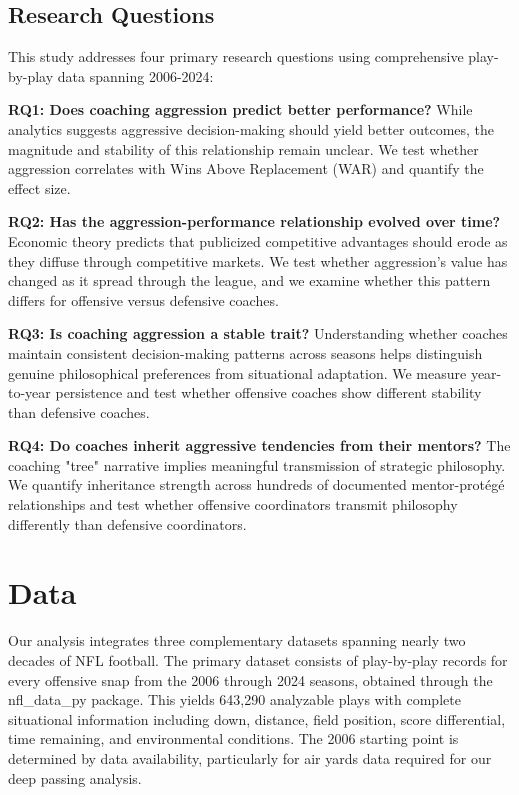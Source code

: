 \documentclass[11pt,twocolumn]{article}
\begin{document}
\subsection{Research Questions}

This study addresses four primary research questions using comprehensive play-by-play data spanning 2006-2024:

\textbf{RQ1: Does coaching aggression predict better performance?} While analytics suggests aggressive decision-making should yield better outcomes, the magnitude and stability of this relationship remain unclear. We test whether aggression correlates with Wins Above Replacement (WAR) and quantify the effect size.

\textbf{RQ2: Has the aggression-performance relationship evolved over time?} Economic theory predicts that publicized competitive advantages should erode as they diffuse through competitive markets. We test whether aggression's value has changed as it spread through the league, and we examine whether this pattern differs for offensive versus defensive coaches.

\textbf{RQ3: Is coaching aggression a stable trait?} Understanding whether coaches maintain consistent decision-making patterns across seasons helps distinguish genuine philosophical preferences from situational adaptation. We measure year-to-year persistence and test whether offensive coaches show different stability than defensive coaches.

\textbf{RQ4: Do coaches inherit aggressive tendencies from their mentors?} The coaching "tree" narrative implies meaningful transmission of strategic philosophy. We quantify inheritance strength across hundreds of documented mentor-protégé relationships and test whether offensive coordinators transmit philosophy differently than defensive coordinators.

\section{Data}

Our analysis integrates three complementary datasets spanning nearly two decades of NFL football. The primary dataset consists of play-by-play records for every offensive snap from the 2006 through 2024 seasons, obtained through the nfl\_data\_py package. This yields 643,290 analyzable plays with complete situational information including down, distance, field position, score differential, time remaining, and environmental conditions. The 2006 starting point is determined by data availability, particularly for air yards data required for our deep passing analysis.
\end{document}
